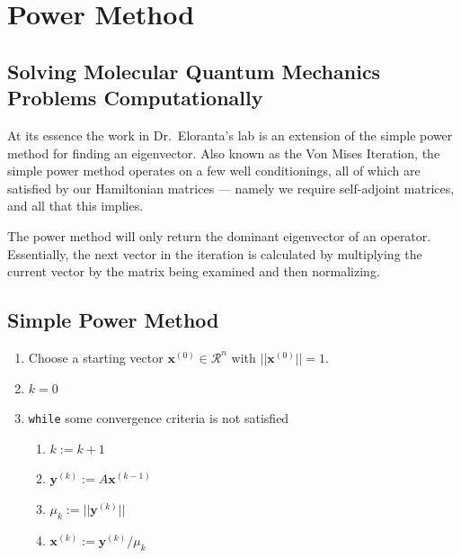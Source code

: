 \documentclass[12pt,]{book}
\providecommand{\tightlist}{%
  \setlength{\itemsep}{0pt}\setlength{\parskip}{0pt}}
\begin{document}
\chapter{Power Method}

\section{Solving Molecular Quantum Mechanics Problems
Computationally}\label{solving-molecular-quantum-mechanics-problems-computationally}

At its essence the work in Dr.~Eloranta's lab is an extension of the
simple power method for finding an eigenvector. Also known as the Von
Mises Iteration, the simple power method operates on a few well
conditionings, all of which are satisfied by our Hamiltonian matrices
--- namely we require self-adjoint matrices, and all that this implies.

The power method will only return the dominant eigenvector of an
operator. Essentially, the next vector in the iteration is calculated by
multiplying the current vector by the matrix being examined and then
normalizing.

\vfill

\pagebreak

\section{Simple Power Method}\label{simple-power-method}

\begin{enumerate}
\def\labelenumi{\arabic{enumi}.}
\item
  Choose a starting vector \(\mathbf{x}^{(0)}\in\mathcal{R}^n\) with
  \(\rvert\rvert\mathbf{x}^{(0)}\rvert\rvert=1\).
\item
  \(k=0\)
\item
  \texttt{while} some convergence criteria is not satisfied

  \begin{enumerate}
  \def\labelenumii{\roman{enumii}.}
  \tightlist
  \item
    \(k:=k+1\)
  \item
    \(\mathbf{y}^{(k)}:=A\mathbf{x}^{(k-1)}\)
  \item
    \(\mu_k:=\rvert\rvert\mathbf{y}^{(k)}\rvert\rvert\)
  \item
    \(\mathbf{x}^{(k)}:=\mathbf{y}^{(k)}/\mu_k\)
  \end{enumerate}
\end{enumerate}
\end{document}
